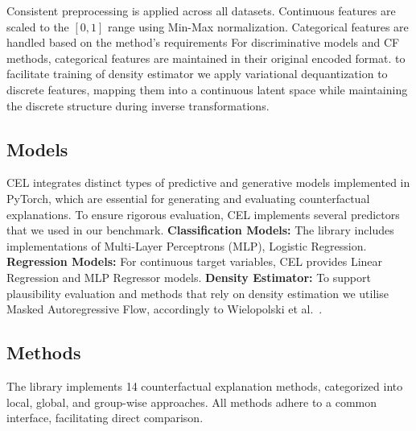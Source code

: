 \documentclass[runningheads]{llncs}
\begin{document}

Consistent preprocessing is applied across all datasets. Continuous features are scaled to the $[0, 1]$ range using Min-Max normalization. Categorical features are handled based on the method's requirements For discriminative models and CF methods, categorical features are maintained in their original encoded format. to facilitate training of density estimator we apply variational dequantization to discrete features, mapping them into a continuous latent space  while maintaining the discrete structure during inverse transformations.

\subsection{Models}
CEL integrates distinct types of predictive and generative models implemented in PyTorch, which are essential for generating and evaluating counterfactual explanations. To ensure rigorous evaluation, CEL implements several predictors that we used in our benchmark. \textbf{Classification Models:} The library includes implementations of Multi-Layer Perceptrons (MLP), Logistic Regression. \textbf{Regression Models:} For continuous target variables, CEL provides Linear Regression and MLP Regressor models. \textbf{Density Estimator:} To support plausibility evaluation and methods that rely on density estimation we utilise Masked Autoregressive Flow, accordingly to Wielopolski et al.~\cite{wielopolski2024probabilistically}. 


\subsection{Methods}
The library implements 14 counterfactual explanation methods, categorized into local, global, and group-wise approaches. All methods adhere to a common interface, facilitating direct comparison.
\end{document}
